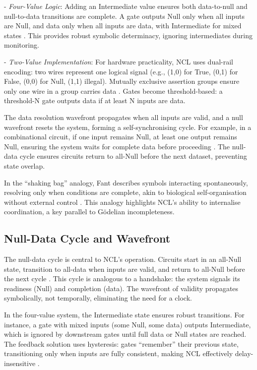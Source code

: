 \documentclass{article}
\begin{document}
- \textit{Four-Value Logic}: Adding an Intermediate value ensures both data-to-null and null-to-data transitions are complete. A gate outputs Null only when all inputs are Null, and data only when all inputs are data, with Intermediate for mixed states \citep{fant2005}. This provides robust symbolic determinacy, ignoring intermediates during monitoring.

- \textit{Two-Value Implementation}: For hardware practicality, NCL uses dual-rail encoding: two wires represent one logical signal (e.g., (1,0) for True, (0,1) for False, (0,0) for Null, (1,1) illegal). Mutually exclusive assertion groups ensure only one wire in a group carries data \citep{fant2005}. Gates become threshold-based: a threshold-N gate outputs data if at least N inputs are data.

The data resolution wavefront propagates when all inputs are valid, and a null wavefront resets the system, forming a self-synchronising cycle. For example, in a combinational circuit, if one input remains Null, at least one output remains Null, ensuring the system waits for complete data before proceeding \citep{fant2005}. The null-data cycle ensures circuits return to all-Null before the next dataset, preventing state overlap.

In the ``shaking bag'' analogy, Fant describes symbols interacting spontaneously, resolving only when conditions are complete, akin to biological self-organisation without external control \citep{fant2005, schneider2005}. This analogy highlights NCL's ability to internalise coordination, a key parallel to G\"{o}delian incompleteness.

\subsection{Null-Data Cycle and Wavefront}
The null-data cycle is central to NCL's operation. Circuits start in an all-Null state, transition to all-data when inputs are valid, and return to all-Null before the next cycle \citep{fant2005}. This cycle is analogous to a handshake: the system signals its readiness (Null) and completion (data). The wavefront of validity propagates symbolically, not temporally, eliminating the need for a clock.

In the four-value system, the Intermediate state ensures robust transitions. For instance, a gate with mixed inputs (some Null, some data) outputs Intermediate, which is ignored by downstream gates until full data or Null states are reached. The feedback solution uses hysteresis: gates ``remember'' their previous state, transitioning only when inputs are fully consistent, making NCL effectively delay-insensitive \citep{fant2005}.
\end{document}
